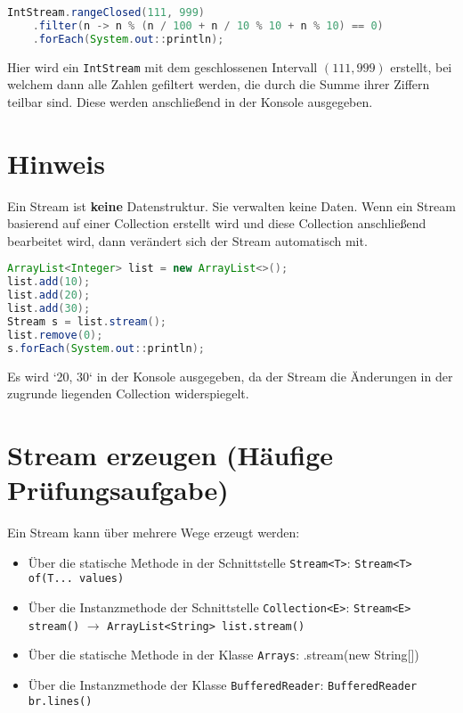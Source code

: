 \begin{lstlisting}[language=Java, caption={Beispiel eines IntStreams}]
IntStream.rangeClosed(111, 999)
    .filter(n -> n % (n / 100 + n / 10 % 10 + n % 10) == 0)
    .forEach(System.out::println);
\end{lstlisting}

Hier wird ein \lstinline{IntStream} mit dem geschlossenen Intervall \((111, 999)\) erstellt, bei welchem dann alle Zahlen gefiltert werden, die durch die Summe ihrer Ziffern teilbar sind. Diese werden anschließend in der Konsole ausgegeben.

\section{Hinweis}

Ein Stream ist \textbf{keine} Datenstruktur. Sie verwalten keine Daten. Wenn ein Stream basierend auf einer Collection erstellt wird und diese Collection anschließend bearbeitet wird, dann verändert sich der Stream automatisch mit.

\begin{lstlisting}[language=Java, caption={Stream über Collection}]
ArrayList<Integer> list = new ArrayList<>();
list.add(10);
list.add(20);
list.add(30);
Stream s = list.stream();
list.remove(0);
s.forEach(System.out::println);
\end{lstlisting}
Es wird `20, 30` in der Konsole ausgegeben, da der Stream die Änderungen in der zugrunde liegenden Collection widerspiegelt.

\section{Stream erzeugen (Häufige Prüfungsaufgabe)}

Ein Stream kann über mehrere Wege erzeugt werden:

\begin{itemize}
    \item Über die statische Methode in der Schnittstelle \lstinline{Stream<T>}:
    \lstinline{Stream<T> of(T... values)}
    \item Über die Instanzmethode der Schnittstelle \lstinline{Collection<E>}:
    \lstinline{Stream<E> stream()} \(\rightarrow\) \lstinline{ArrayList<String> list.stream()}
    \item Über die statische Methode in der Klasse \lstinline{Arrays}:
    \lstinlineArrays.stream(new String[])
    \item Über die Instanzmethode der Klasse \lstinline{BufferedReader}:
    \lstinline{BufferedReader br.lines()}
\end{itemize}

